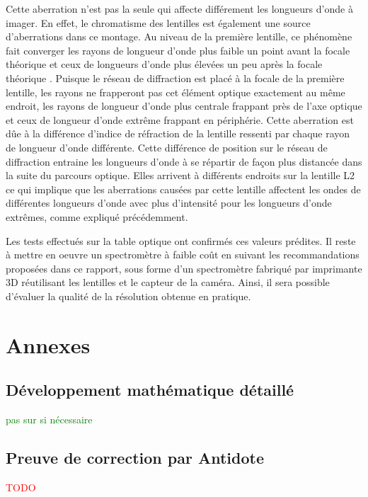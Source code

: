 \documentclass[conference]{IEEEtran}
\begin{document}
Cette aberration n'est pas la seule qui affecte différement les longueurs d'onde à imager. En effet, le chromatisme des lentilles
est également une source d'aberrations dans ce montage. Au niveau de la première lentille, ce phénomène fait converger les rayons 
de longueur d'onde plus faible un point avant la focale théorique et ceux de longueurs d'onde plus élevées un peu après la focale
théorique \cite{wikipedia_aberration_chromatique}. Puisque le réseau de diffraction est placé à la focale de la première lentille, les rayons ne
frapperont pas cet élément optique exactement au même endroit, les rayons de longueur d'onde plus centrale frappant près de l'axe
optique et ceux de longueur d'onde extrême frappant en périphérie. Cette aberration est dûe à la différence d'indice de réfraction 
de la lentille ressenti par chaque rayon de longueur d'onde différente\cite{wikipedia_aberration_chromatique}. Cette différence 
de position sur le réseau de diffraction entraine les longueurs d'onde à se répartir de façon plus distancée dans la suite du parcours
optique. Elles arrivent à différents endroits sur la lentille L2 ce qui implique que les aberrations causées par cette lentille
affectent les ondes de différentes longueurs d'onde avec plus d'intensité pour les longueurs d'onde extrêmes, comme expliqué précédemment.

Les tests effectués sur la table optique ont confirmés ces valeurs prédites. Il reste à mettre en oeuvre un spectromètre à faible 
coût en suivant les recommandations proposées dans ce rapport, sous forme d'un spectromètre fabriqué par imprimante 3D réutilisant 
les lentilles et le capteur de la caméra. Ainsi, il sera possible d'évaluer la qualité de la résolution obtenue en pratique.

\printbibliography

\clearpage

\section{Annexes}

\subsection{Développement mathématique détaillé}
\textcolor{green}{pas sur si nécessaire}

\subsection{Preuve de correction par Antidote}
\textcolor{red}{TODO}


\clearpage
\end{document}
